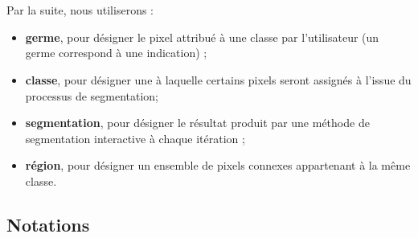 \section{}

\subsection{}
Par la suite, nous utiliserons  :

\begin{itemize}
\item \textbf{germe}, pour désigner le pixel attribué à une classe par l'utilisateur (un germe correspond à une indication)  ;
\item \textbf{classe},  pour désigner  une  à laquelle certains pixels seront assignés à l'issue du processus de segmentation;
\item \textbf{segmentation}, pour désigner le résultat produit par une méthode de segmentation interactive à chaque itération ;
\item \textbf{région}, pour désigner un ensemble de pixels connexes appartenant à la même classe.
\end{itemize}

\subsection{Notations}

